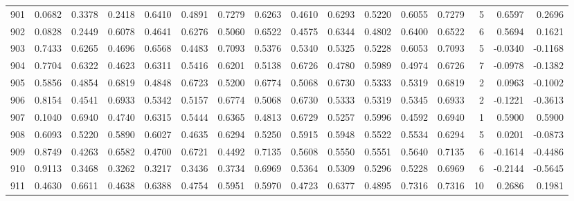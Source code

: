 \begin{tabular}{lrrrrrrrrrrrrrrr}
901 &      0.0682 &  0.3378 &  0.2418 &  0.6410 &  0.4891 &  0.7279 &  0.6263 &  0.4610 &  0.6293 &  0.5220 &   0.6055 &     0.7279 &      5 &                    0.6597 &                     0.2696 \\
902 &      0.0828 &  0.2449 &  0.6078 &  0.4641 &  0.6276 &  0.5060 &  0.6522 &  0.4575 &  0.6344 &  0.4802 &   0.6400 &     0.6522 &      6 &                    0.5694 &                     0.1621 \\
903 &      0.7433 &  0.6265 &  0.4696 &  0.6568 &  0.4483 &  0.7093 &  0.5376 &  0.5340 &  0.5325 &  0.5228 &   0.6053 &     0.7093 &      5 &                   -0.0340 &                    -0.1168 \\
904 &      0.7704 &  0.6322 &  0.4623 &  0.6311 &  0.5416 &  0.6201 &  0.5138 &  0.6726 &  0.4780 &  0.5989 &   0.4974 &     0.6726 &      7 &                   -0.0978 &                    -0.1382 \\
905 &      0.5856 &  0.4854 &  0.6819 &  0.4848 &  0.6723 &  0.5200 &  0.6774 &  0.5068 &  0.6730 &  0.5333 &   0.5319 &     0.6819 &      2 &                    0.0963 &                    -0.1002 \\
906 &      0.8154 &  0.4541 &  0.6933 &  0.5342 &  0.5157 &  0.6774 &  0.5068 &  0.6730 &  0.5333 &  0.5319 &   0.5345 &     0.6933 &      2 &                   -0.1221 &                    -0.3613 \\
907 &      0.1040 &  0.6940 &  0.4740 &  0.6315 &  0.5444 &  0.6365 &  0.4813 &  0.6729 &  0.5257 &  0.5996 &   0.4592 &     0.6940 &      1 &                    0.5900 &                     0.5900 \\
908 &      0.6093 &  0.5220 &  0.5890 &  0.6027 &  0.4635 &  0.6294 &  0.5250 &  0.5915 &  0.5948 &  0.5522 &   0.5534 &     0.6294 &      5 &                    0.0201 &                    -0.0873 \\
909 &      0.8749 &  0.4263 &  0.6582 &  0.4700 &  0.6721 &  0.4492 &  0.7135 &  0.5608 &  0.5550 &  0.5551 &   0.5640 &     0.7135 &      6 &                   -0.1614 &                    -0.4486 \\
910 &      0.9113 &  0.3468 &  0.3262 &  0.3217 &  0.3436 &  0.3734 &  0.6969 &  0.5364 &  0.5309 &  0.5296 &   0.5228 &     0.6969 &      6 &                   -0.2144 &                    -0.5645 \\
911 &      0.4630 &  0.6611 &  0.4638 &  0.6388 &  0.4754 &  0.5951 &  0.5970 &  0.4723 &  0.6377 &  0.4895 &   0.7316 &     0.7316 &     10 &                    0.2686 &                     0.1981 \\

\end{tabular}
